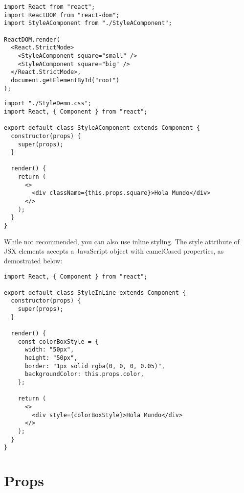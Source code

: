 \documentclass[a4paper, oneside, titlepage, 12pt]{book}
\begin{document}
\begin{verbatim}
import React from "react";
import ReactDOM from "react-dom";
import StyleAComponent from "./StyleAComponent";

ReactDOM.render(
  <React.StrictMode>
    <StyleAComponent square="small" />
    <StyleAComponent square="big" />
  </React.StrictMode>,
  document.getElementById("root")
);
\end{verbatim}

\begin{verbatim}
import "./StyleDemo.css";
import React, { Component } from "react";

export default class StyleAComponent extends Component {
  constructor(props) {
    super(props);
  }

  render() {
    return (
      <>
        <div className={this.props.square}>Hola Mundo</div>
      </>
    );
  }
}
\end{verbatim}

While not recommended, you can also use inline styling. The style attribute of JSX elements accepts a JavaScript object with camelCased properties, as demostrated below:


\begin{verbatim}
import React, { Component } from "react";

export default class StyleInLine extends Component {
  constructor(props) {
    super(props);
  }

  render() {
    const colorBoxStyle = {
      width: "50px",
      height: "50px",
      border: "1px solid rgba(0, 0, 0, 0.05)",
      backgroundColor: this.props.color,
    };

    return (
      <>
        <div style={colorBoxStyle}>Hola Mundo</div>
      </>
    );
  }
}
\end{verbatim}



\section{Props}
\end{document}
